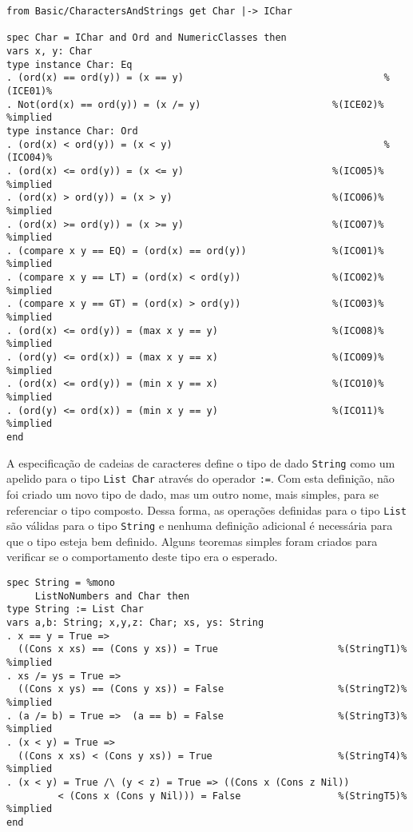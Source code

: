 \begin{Verbatim}
from Basic/CharactersAndStrings get Char |-> IChar

spec Char = IChar and Ord and NumericClasses then
vars x, y: Char
type instance Char: Eq                             
. (ord(x) == ord(y)) = (x == y)                                   %(ICE01)%
. Not(ord(x) == ord(y)) = (x /= y)                       %(ICE02)% %implied
type instance Char: Ord                                  
. (ord(x) < ord(y)) = (x < y)                                     %(ICO04)%
. (ord(x) <= ord(y)) = (x <= y)                          %(ICO05)% %implied
. (ord(x) > ord(y)) = (x > y)                            %(ICO06)% %implied
. (ord(x) >= ord(y)) = (x >= y)                          %(ICO07)% %implied
. (compare x y == EQ) = (ord(x) == ord(y))               %(ICO01)% %implied
. (compare x y == LT) = (ord(x) < ord(y))                %(ICO02)% %implied
. (compare x y == GT) = (ord(x) > ord(y))                %(ICO03)% %implied
. (ord(x) <= ord(y)) = (max x y == y)                    %(ICO08)% %implied
. (ord(y) <= ord(x)) = (max x y == x)                    %(ICO09)% %implied
. (ord(x) <= ord(y)) = (min x y == x)                    %(ICO10)% %implied
. (ord(y) <= ord(x)) = (min x y == y)                    %(ICO11)% %implied
end
\end{Verbatim}

A especificação de cadeias de caracteres define o tipo de dado \Verb.String. como um apelido para o tipo \Verb.List Char. através do operador \Verb.:=..
Com esta definição, não foi criado um novo tipo de dado, mas um outro nome, mais simples, para se referenciar o tipo composto.
Dessa forma, as operações definidas para o tipo \Verb.List. são válidas para o tipo \Verb.String. e nenhuma definição adicional é necessária para que o tipo esteja bem definido.
Alguns teoremas simples foram criados para verificar se o comportamento deste tipo era o esperado.

\begin{Verbatim}
spec String = %mono
     ListNoNumbers and Char then
type String := List Char
vars a,b: String; x,y,z: Char; xs, ys: String
. x == y = True =>
  ((Cons x xs) == (Cons y xs)) = True                     %(StringT1)% %implied
. xs /= ys = True => 
  ((Cons x ys) == (Cons y xs)) = False                    %(StringT2)% %implied
. (a /= b) = True =>  (a == b) = False                    %(StringT3)% %implied
. (x < y) = True => 
  ((Cons x xs) < (Cons y xs)) = True                      %(StringT4)% %implied
. (x < y) = True /\ (y < z) = True => ((Cons x (Cons z Nil)) 
         < (Cons x (Cons y Nil))) = False                 %(StringT5)% %implied
end
\end{Verbatim}

